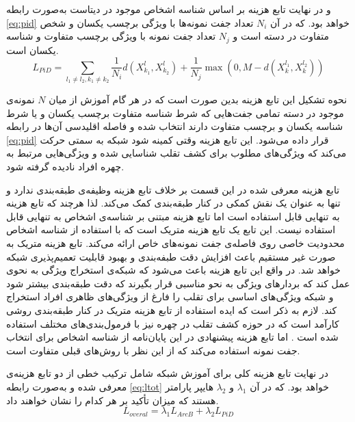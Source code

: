  و در نهایت تابع هزینه بر اساس شناسه اشخاص موجود در دیتاست به‌صورت رابطه
\ref{eq:pid}
  خواهد بود. که در آن  
 $N_i$
   تعداد جفت نمونه‌ها با ویژگی برچسب یکسان و شخص متفاوت در دسته است و 
   $N_j$
       تعداد جفت نمونه با ویژگی برچسب متفاوت و شناسه یکسان است.
\begin{equation}\label{eq:pid}
  	L_{PiD} = \sum_{l_1 \ne l_2,k_1 \ne k_2}{\frac{1}{N_i}d( X_{k_1}^{l},X_{k_2}^{l})+\frac{1}{N_j}\max(0,M-d( X_{k}^{l_1},X_{k}^{l_2} ))}
\end{equation}

 نحوه تشکیل این تابع هزینه بدین صورت است که در هر گام آموزش از میان $N$ نمونه‌ی موجود در دسته تمامی جفت‌هایی که شرط شناسه متفاوت برچسب یکسان و یا شرط شناسه یکسان و برچسب متفاوت دارند انتخاب شده و فاصله اقلیدسی آن‌ها در رابطه
\ref{eq:pid}
 قرار داده می‌شود. این تابع هزینه وقتی کمینه شود شبکه به سمتی حرکت می‌کند که ویژگی‌های مطلوب برای کشف تقلب شناسایی شده و ویژگی‌هایی مرتبط به چهره افراد نادیده گرفته شود.
 
 تابع هزینه معرفی شده در این قسمت بر خلاف تابع هزینه
 وظیفه‌ی طبقه‌بندی ندارد و تنها به عنوان یک نقش کمکی در کنار طبقه‌بندی کمک می‌کند. لذا هرچند که تابع هزینه 
  به تنهایی قابل استفاده است اما تابع هزینه مبتنی بر شناسه‌ی اشخاص به تنهایی قابل استفاده نیست. این تابع یک تابع هزینه متریک است که با استفاده از شناسه اشخاص محدودیت خاصی روی فاصله‌ی جفت نمونه‌های خاص ارائه می‌کند. تابع هزینه متریک به صورت غیر مستقیم باعث افزایش دقت طبفه‌بندی و بهبود قابلیت تعمیم‌پذیری شبکه خواهد شد. در واقع این تابع هزینه باعث می‌شود که شبکه‌ی استخراج ویژگی به نحوی عمل کند که بردار‌های ویژگی به نحو مناسبی قرار بگیرند که دقت طبقه‌بندی بیشتر شود و شبکه ویژگی‌های اساسی برای تقلب را فارغ از ویژگی‌های ظاهری افراد استخراج کند. لازم به ذکر است که ایده استفاده از تابع هزینه متریک در کنار طبقه‌بندی روشی کارآمد است که در حوزه کشف تقلب در چهره نیز با فرمول‌بندی‌های مختلف استفاده شده است
\cite{shao2019multi,jia2020single,feng2020learning,perez2019deep,tu2020learning,xu2021improving}.
اما تابع هزینه پیشنهادی در این پایان‌نامه از شناسه اشخاص برای انتخاب جفت نمونه استفاده می‌کند که از این نظر با روش‌های قبلی متفاوت است.
  
  در نهایت تابع هزینه کلی برای آموزش شبکه شامل ترکیب خطی از دو تابع هزینه‌ی معرفی شده و به‌صورت رابطه
\ref{eq:ltot}
 خواهد بود. که در آن 
 $\lambda_1$
 و
 $\lambda_2$
   هایپر پارامتر هستند که میزان تأکید بر هر کدام را نشان خواهند داد.
\begin{equation}\label{eq:ltot}
	L_{overal} = \lambda_1L_{ArcB} + \lambda_2L_{PiD}
\end{equation}

